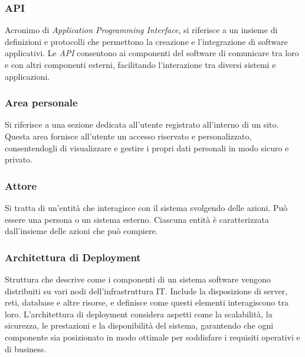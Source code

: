 
\subsubsection*{API}
Acronimo di \textit{Application Programming Interface}, si riferisce a un 
insieme di definizioni e protocolli che permettono la creazione e l'integrazione di software applicativi.
Le \textit{API} consentono ai componenti del software di comunicare tra loro e con altri componenti esterni, 
facilitando l'interazione tra diversi sistemi e applicazioni.

\subsubsection*{Area personale}
Si riferisce a una sezione dedicata all'utente registrato all'interno di un sito. 
Questa area fornisce all'utente un accesso riservato e personalizzato, consentendogli di visualizzare e gestire i propri dati personali in modo sicuro e privato. 

\subsubsection*{Attore}
Si tratta di un'entità che interagisce con il sistema svolgendo delle azioni.
Può essere una persona o un sistema esterno. Ciascuna entità è caratterizzata
dall'insieme delle azioni che può compiere.

\subsubsection*{Architettura di Deployment}
Struttura che descrive come i componenti di un sistema software vengono distribuiti su vari nodi dell'infrastruttura IT. 
Include la disposizione di server, reti, database e altre risorse, e definisce come questi elementi interagiscono tra loro. 
L'architettura di deployment considera aspetti come la scalabilità, la sicurezza, le prestazioni e la disponibilità del sistema, 
garantendo che ogni componente sia posizionato in modo ottimale per soddisfare i requisiti operativi e di business.

\newpage
